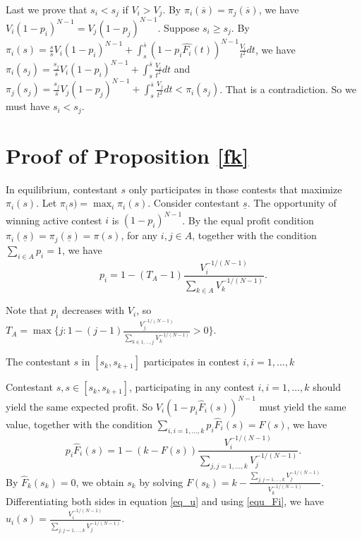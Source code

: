 \documentclass[12pt]{article}
\begin{document}
Last we prove that $s_{i}<s_{j}$ if $V_{i}>V_{j}$. By $\pi_{i}(\overline{s})=\pi_{j}(\overline{s})$,
we have $V_{i}(1-p_{i})^{N-1}=V_{j}(1-p_{j})^{N-1}$. Suppose $s_{i}\geq s_{j}$.
By $\pi_{i}(s)=\frac{s}{\overline{s}}V_{i}(1-p_{i})^{N-1}+\int_{s}^{\overline{s}}(1-p_{i}\hat{F_{i}}(t))^{N-1}\frac{V_{i}}{t^{2}}dt$,
we have $\pi_{i}(s_{j})=\frac{s_{j}}{\overline{s}}V_{i}(1-p_{i})^{N-1}+\int_{s}^{\overline{s}}\frac{V_{i}}{t^{2}}dt$
and $\pi_{j}(s_{j})=\frac{s_{j}}{\overline{s}}V_{j}(1-p_{j})^{N-1}+\int_{s}^{\overline{s}}\frac{V_{j}}{t^{2}}dt<\pi_{i}(s_{j})$.
That is a contradiction. So we must have $s_{i}<s_{j}$.


\section{Proof of Proposition \ref{fk}}

In equilibrium, contestant $s$ only participates in those contests
that maximize $\pi_{i}(s)$. Let $\pi_{(}s)=\max_{i}{\pi_{i}(s)}$.
Consider contestant $\underline{s}$. The opportunity of winning active
contest $i$ is $(1-p_{i})^{N-1}$. By the equal profit condition
$\pi_{i}(\underline{s})=\pi_{j}(\underline{s})=\pi(s)$, for any $i,j\in A$,
together with the condition $\sum_{i\in A}p_{i}=1$, we have
\begin{equation}
p_{i}=1-(T_{A}-1)\frac{V_{i}^{-1/(N-1)}}{\sum_{k\in A}V_{k}^{-1/(N-1)}}.
\end{equation}


Note that $p_{i}$ decreases with $V_{i}$, so $T_{A}=\max\{j:1-(j-1)\frac{V_{j}^{-1/(N-1)}}{\sum_{k\in{1,\dots,j}}V_{k}^{-1/(N-1)}}>0\}$.

The contestant $s$ in $[s_{k},s_{k+1}]$ participates in contest
$i,{i=1,\dots,k}$

Contestant $s,s\in[s_{k},s_{k+1}]$, participating in any contest
$i,i=1,\dots,k$ should yield the same expected profit. So $V_{i}(1-p_{i}\hat{F}_{i}(s))^{N-1}$
must yield the same value, together with the condition $\sum_{i,i=1,\dots,k}p_{i}\hat{F}_{i}(s)=F(s)$,
we have
\begin{equation}
p_{i}\hat{F}_{i}(s)=1-(k-F(s))\frac{V_{i}^{-1/(N-1)}}{\sum_{j,j=1,\dots,k}V_{j}^{-1/(N-1)}}.\label{equ_Fi}
\end{equation}
By $\hat{F}_{k}(s_{k})=0$, we obtain $s_{k}$ by solving $F(s_{k})=k-\frac{\sum_{j,j=1,\dots,k}V_{j}^{-1/(N-1)}}{V_{k}^{-1/(N-1)}}$.
Differentiating both sides in equation \ref{eq_u} and using \ref{equ_Fi},
we have $u_{i}(s)=\frac{V_{i}^{-1/(N-1)}}{\sum_{j,j=1,\dots,k}V_{j}^{-1/(N-1)}}$.
\end{document}
